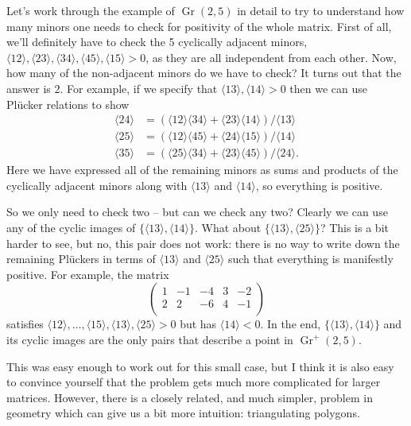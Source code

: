 \documentclass[11pt]{article}
\DeclareMathOperator{\Gr}{Gr}
\def\ket#1{\langle #1 \rangle}
\begin{document}
Let's work through the example of $\Gr(2,5)$ in detail to try to understand how many minors one needs to check for positivity of the whole matrix. First of all, we'll definitely have to check the 5 cyclically adjacent minors, $\ket{12}, \ket{23}, \ket{34}, \ket{45}, \ket{15}> 0$, as they are all independent from each other. Now, how many of the non-adjacent minors do we have to check? It turns out that the answer is 2. For example, if we specify that $\ket{13}, \ket{14}>0$ then we can use Pl\"ucker relations to show
\begin{equation}
\begin{split}
	\ket{24} &= (\ket{12}\ket{34} + \ket{23}\ket{14})/\ket{13}\\
	\ket{25} &= (\ket{12}\ket{45} + \ket{24}\ket{15})/\ket{14}\\
	\ket{35} &= (\ket{25}\ket{34} + \ket{23}\ket{45})/\ket{24}.
\end{split}	 	
\end{equation} 
Here we have expressed all of the remaining minors as sums and products of the cyclically adjacent minors along with $\ket{13}$ and $\ket{14}$, so everything is positive. 

So we only need to check two -- but can we check any two? Clearly we can use any of the cyclic images of $\{\ket{13}, \ket{14}\}$. What about $\{\ket{13}, \ket{25}\}$? This is a bit harder to see, but no, this pair does not work: there is no way to write down the remaining Pl\"uckers in terms of $\ket{13}$ and $\ket{25}$ such that everything is manifestly positive. For example, the matrix
\begin{equation}
\left(
\begin{array}{ccccc}
 1 & -1 & -4 & 3 & -2 \\
 2 & 2 & -6 & 4 & -1 \\
\end{array}
\right)
\end{equation}
satisfies $\ket{12},\ldots,\ket{15},\ket{13},\ket{25}>0$ but has $\ket{14}<0$. In the end, $\{\ket{13}, \ket{14}\}$ and its cyclic images are the only pairs that describe a point in $\Gr^+(2,5)$. 

This was easy enough to work out for this small case, but I think it is also easy to convince yourself that the problem gets much more complicated for larger matrices. However, there is a closely related, and much simpler, problem in geometry which can give us a bit more intuition: triangulating polygons.
\end{document}
